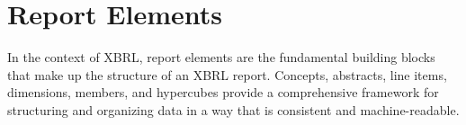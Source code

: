 \section{Report Elements}

In the context of XBRL, report elements are the fundamental building blocks that make up the structure of an XBRL report. 
Concepts, abstracts, line items, dimensions, members, and hypercubes provide a comprehensive framework for structuring and organizing data in a way that is consistent and machine-readable.